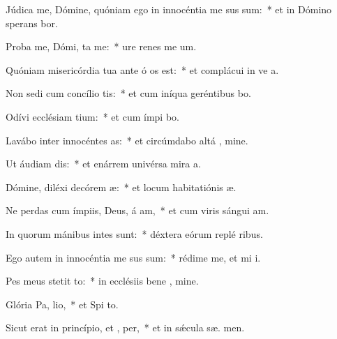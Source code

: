 \item Júdica me, Dómine, quóniam ego in innocéntia me sus sum:~* et in Dómino sperans  bor.
\item Proba me, Dómi,  ta me:~* ure renes me   um.
\item Quóniam misericórdia tua ante ó os est:~* et complácui in ve a.
\item Non sedi cum concílio tis:~* et cum iníqua geréntibus  bo.
\item Odívi ecclésiam tium:~* et cum ímpi  bo.
\item Lavábo inter innocéntes  as:~* et circúmdabo altá , mine.
\item Ut áudiam  dis:~* et enárrem univérsa mira a.
\item Dómine, diléxi decórem  æ:~* et locum habitatiónis  æ.
\item Ne perdas cum ímpiis, Deus, á am,~* et cum viris sángui  am.
\item In quorum mánibus intes sunt:~* déxtera eórum replé  ribus.
\item Ego autem in innocéntia me sus sum:~* rédime me, et mi i.
\item Pes meus stetit  to:~* in ecclésiis bene , mine.
\item Glória Pa,  lio,~* et Spi to.
\item Sicut erat in princípio, et ,  per,~* et in sǽcula sæ. men.
